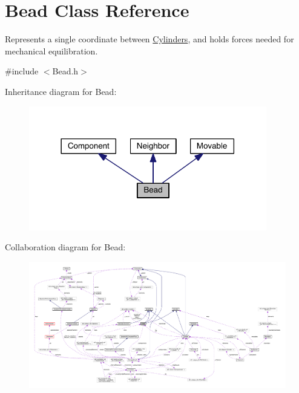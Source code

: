 \hypertarget{classBead}{\section{Bead Class Reference}
\label{classBead}
}


Represents a single coordinate between \hyperlink{classCylinder}{Cylinders}, and holds forces needed for mechanical equilibration.  




{\ttfamily \#include $<$Bead.\+h$>$}



Inheritance diagram for Bead\+:\nopagebreak
\begin{figure}[H]
\begin{center}
\leavevmode
\includegraphics[width=294pt]{classBead__inherit__graph}
\end{center}
\end{figure}


Collaboration diagram for Bead\+:
\nopagebreak
\begin{figure}[H]
\begin{center}
\leavevmode
\includegraphics[width=350pt]{classBead__coll__graph}
\end{center}
\end{figure}
